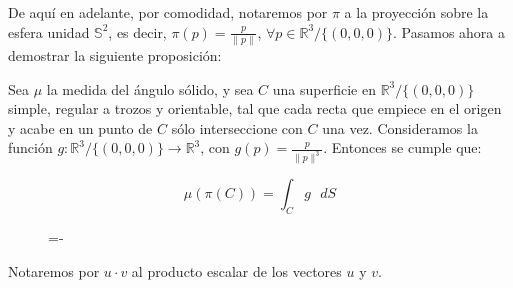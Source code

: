 De aquí en adelante, por comodidad, notaremos por $\pi$ a la proyección sobre la esfera unidad $\mathds{S}^2$, es decir, $\pi(p)=\frac{p}{\|p\|}$, $\forall p \in \mathds{R}^3/\{(0,0,0)\}$. Pasamos ahora a demostrar la siguiente proposición:

\begin{proposicion}\label{angSolido1}
  Sea $\mu$ la medida del ángulo sólido, y sea $C$ una superficie en $\mathds{R}^3/\{(0,0,0)\}$ simple, regular a trozos y orientable, tal que cada recta que empiece en el origen y acabe en un punto de $C$ sólo interseccione con $C$ una vez. Consideramos la función $g:\mathds{R}^3/\{(0,0,0)\} \rightarrow \mathds{R}^3$, con $g(p)=\frac{p}{\|p\|^3}$. Entonces se cumple que:

 \begin{equation}
 \mu (\pi(C)) = \int _C g \text{ }dS 
 \end{equation}
 
\end{proposicion}

\begin{figure}[h]
  \lineskip=-\fboxrule
\end{figure}

\begin{notacion}
Notaremos por $u \cdot v$ al producto escalar de los vectores $u$ y $v$.
\end{notacion}

